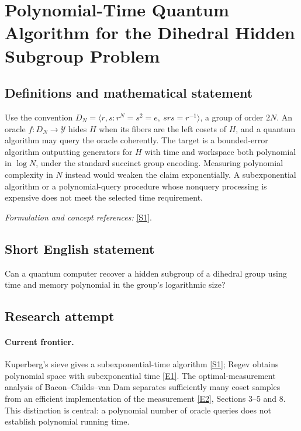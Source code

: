 \documentclass[11pt,a4paper]{article}
\newcommand{\sref}[2]{\hyperlink{source:#1:#2}{[S#2]}}
\newcommand{\eref}[2]{\hyperlink{extra:#1:#2}{[E#2]}}
\newif\ifshowcatalogue
\newcommand{\cataloguescope}[1]{\ifshowcatalogue
 \paragraph{Exact scope in the supplied catalogue.}
 \begin{quote}\small #1\end{quote}\fi}
\begin{document}
\setcounter{section}{0}
\clearpage
\section*{\texorpdfstring{Polynomial-Time Quantum Algorithm for the Dihedral Hidden Subgroup Problem}{Polynomial-Time Quantum Algorithm for the Dihedral Hidden Subgroup Problem}}\label{30006794}
\subsection{Definitions and mathematical statement}
Use the convention
$D_N=\langle r,s:r^N=s^2=e,\ srs=r^{-1}\rangle$, a group of order $2N$. An oracle $f:D_N\to\mathcal Y$ hides $H$ when its fibers are the left cosets of $H$, and a quantum algorithm may query the oracle coherently. The target is a bounded-error algorithm outputting generators for $H$ with time and workspace both polynomial in $\log N$, under the standard succinct group encoding. Measuring polynomial complexity in $N$ instead would weaken the claim exponentially. A subexponential algorithm or a polynomial-query procedure whose nonquery processing is expensive does not meet the selected time requirement.
\par\smallskip\textit{Formulation and concept references:} \sref{30006794}{1}.
\cataloguescope{Find a polynomial-time quantum algorithm with poly(log N) operations and space for the hidden subgroup problem in dihedral groups D\_N.}
\subsection{Short English statement}
Can a quantum computer recover a hidden subgroup of a dihedral group using time and memory polynomial in the group's logarithmic size?
\subsection{Research attempt}

\paragraph{Current frontier.}
Kuperberg's sieve gives a subexponential-time algorithm \sref{30006794}{1};
Regev obtains polynomial space with subexponential time \eref{30006794}{1}.
The optimal-measurement analysis of Bacon--Childs--van Dam separates
sufficiently many coset samples from an efficient implementation of the
measurement \eref{30006794}{2}, Sections 3--5 and 8. This distinction is central:
a polynomial number of oracle queries does not establish polynomial
running time.
\end{document}
